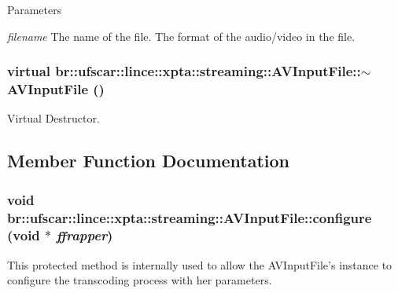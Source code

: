 \begin{DoxyParams}{Parameters}
\item[{\em filename}]The name of the file.  The format of the audio/video in the file. \end{DoxyParams}
\hypertarget{classbr_1_1ufscar_1_1lince_1_1xpta_1_1streaming_1_1AVInputFile_a82740533847b4a48be055571a7298da6}{
\subsubsection[{$\sim$AVInputFile}]{\setlength{\rightskip}{0pt plus 5cm}virtual br::ufscar::lince::xpta::streaming::AVInputFile::$\sim$AVInputFile ()}}
\label{classbr_1_1ufscar_1_1lince_1_1xpta_1_1streaming_1_1AVInputFile_a82740533847b4a48be055571a7298da6}


Virtual Destructor. 



\subsection{Member Function Documentation}
\hypertarget{classbr_1_1ufscar_1_1lince_1_1xpta_1_1streaming_1_1AVInputFile_afee89583e6231825a2282b9bb9860c07}{
\subsubsection[{configure}]{\setlength{\rightskip}{0pt plus 5cm}void br::ufscar::lince::xpta::streaming::AVInputFile::configure (void $\ast$ {\em ffrapper})}}
\label{classbr_1_1ufscar_1_1lince_1_1xpta_1_1streaming_1_1AVInputFile_afee89583e6231825a2282b9bb9860c07}


This protected method is internally used to allow the AVInputFile's instance to configure the transcoding process with her parameters. 


